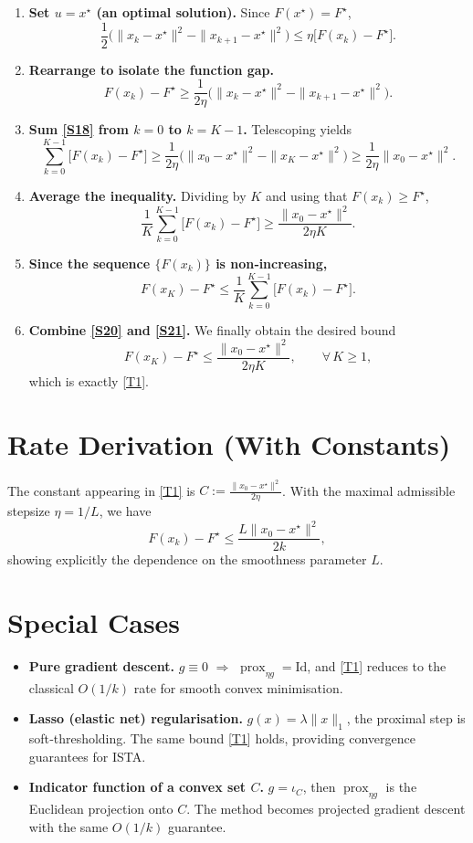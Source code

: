 \documentclass{article}
\begin{document}
\begin{enumerate}[label=[Step \arabic*], leftmargin=*]
\item \textbf{Set $u=x^{\star}$ (an optimal solution).}  
Since $F(x^{\star})=F^{\star}$,
\[
\frac12\bigl(\|x_{k}-x^{\star}\|^{2}-\|x_{k+1}-x^{\star}\|^{2}\bigr)
\le \eta\bigl[F(x_{k})-F^{\star}\bigr].
\tag{S17}
\]

\item \textbf{Rearrange to isolate the function gap.}
\[
F(x_{k})-F^{\star}\ge \frac{1}{2\eta}
\bigl(\|x_{k}-x^{\star}\|^{2}-\|x_{k+1}-x^{\star}\|^{2}\bigr).
\tag{S18}
\]

\item \textbf{Sum \eqref{S18} from $k=0$ to $k=K-1$.}  
Telescoping yields
\[
\sum_{k=0}^{K-1}\bigl[F(x_{k})-F^{\star}\bigr]
\ge \frac{1}{2\eta}\bigl(\|x_{0}-x^{\star}\|^{2}-\|x_{K}-x^{\star}\|^{2}\bigr)
\ge \frac{1}{2\eta}\|x_{0}-x^{\star}\|^{2}.
\tag{S19}
\]

\item \textbf{Average the inequality.}  
Dividing by $K$ and using that $F(x_{k})\ge F^{\star}$,
\[
\frac{1}{K}\sum_{k=0}^{K-1}\bigl[F(x_{k})-F^{\star}\bigr]
\ge \frac{\|x_{0}-x^{\star}\|^{2}}{2\eta K}.
\tag{S20}
\]

\item \textbf{Since the sequence $\{F(x_{k})\}$ is non‑increasing,}
\[
F(x_{K})-F^{\star}\le \frac{1}{K}\sum_{k=0}^{K-1}\bigl[F(x_{k})-F^{\star}\bigr].
\tag{S21}
\]

\item \textbf{Combine \eqref{S20} and \eqref{S21}.}  
We finally obtain the desired bound
\[
F(x_{K})-F^{\star}\le \frac{\|x_{0}-x^{\star}\|^{2}}{2\eta K},
\qquad\forall\,K\ge1,
\]
which is exactly \eqref{T1}.
\end{enumerate}

\section*{Rate Derivation (With Constants)}
The constant appearing in \eqref{T1} is $C:=\frac{\|x_{0}-x^{\star}\|^{2}}{2\eta}$.
With the maximal admissible stepsize $\eta=1/L$, we have
\[
F(x_{k})-F^{\star}\le \frac{L\|x_{0}-x^{\star}\|^{2}}{2k},
\]
showing explicitly the dependence on the smoothness parameter $L$.

\section*{Special Cases}
\begin{itemize}
\item \textbf{Pure gradient descent.} $g\equiv0$ $\Rightarrow$ $\operatorname{prox}_{\eta g}=\mathrm{Id}$, and \eqref{T1} reduces to the classical $O(1/k)$ rate for smooth convex minimisation.
\item \textbf{Lasso (elastic net) regularisation.} $g(x)=\lambda\|x\|_{1}$, the proximal step is soft‑thresholding. The same bound \eqref{T1} holds, providing convergence guarantees for ISTA.
\item \textbf{Indicator function of a convex set $C$.} $g=\iota_{C}$, then $\operatorname{prox}_{\eta g}$ is the Euclidean projection onto $C$. The method becomes projected gradient descent with the same $O(1/k)$ guarantee.
\end{itemize}
\end{document}
